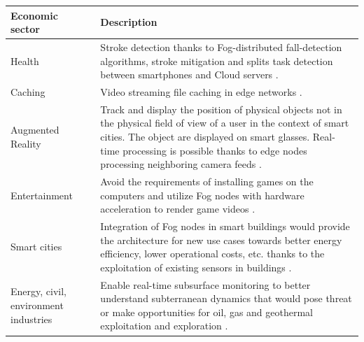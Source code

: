 \documentclass[11pt]{sdm}
\begin{document}
\begin{table}[t]
	\begin{tabular}{|p{3cm}|p{12cm}|}
		\hline
		Economic sector & Description 
		\\
		\hline
		Health 
		& Stroke detection thanks to Fog-distributed fall-detection algorithms, stroke mitigation and splits task detection between smartphones and Cloud servers \cite{hu_survey_2017}.
		\\
		Caching
		& Video streaming file caching in edge networks \cite{ma_understanding_2017}.
		\\
		Augmented Reality
		& Track and display the position of physical objects not in the physical field of view of a user in the context of smart cities. The object are displayed on smart glasses. Real-time processing is possible thanks to edge nodes processing neighboring camera feeds \cite{rausch_towards_2021, rausch_cognitivexr_2020}.
		\\
		Entertainment 
		& Avoid the requirements of installing games on the computers and utilize Fog nodes with hardware acceleration to render game videos \cite{lin_cloudfog_2017}.
		\\
		Smart cities 
		& Integration of Fog nodes in smart buildings would provide the architecture for new use cases towards better energy efficiency, lower operational costs, etc. thanks to the exploitation of existing sensors in buildings \cite{ieee_standards_association_smart_2018}.
		\\
		Energy, civil, environment industries 
		& Enable real-time subsurface monitoring to better understand subterranean dynamics that would pose threat or make opportunities for oil, gas and geothermal exploitation and exploration \cite{openfog_consortium_real-time_2018}.
		\\

\end{tabular}
\end{table}
\end{document}
